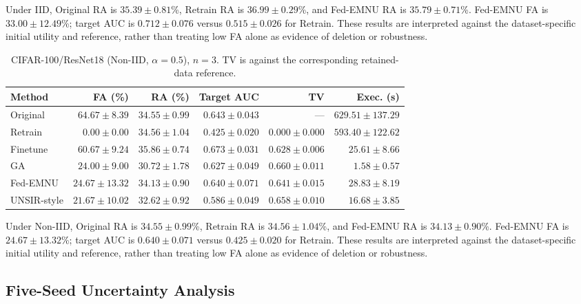 \documentclass[software,article,submit,moreauthors]{Definitions/mdpi}
\begin{document}
Under IID, Original RA is $35.39 \pm 0.81$\%, Retrain RA is $36.99 \pm 0.29$\%, and Fed-EMNU RA is $35.79 \pm 0.71$\%. Fed-EMNU FA is $33.00 \pm 12.49$\%; target AUC is $0.712 \pm 0.076$ versus $0.515 \pm 0.026$ for Retrain. These results are interpreted against the dataset-specific initial utility and reference, rather than treating low FA alone as evidence of deletion or robustness.

\begin{table}[H]
\caption{CIFAR-100/ResNet18 (Non-IID, $\alpha=0.5$), $n=3$. TV is against the corresponding retained-data reference.}
\label{tab:c100-noniid}
\centering\footnotesize\setlength{\tabcolsep}{3.5pt}
\begin{tabular}{lrrrrr}
\toprule
Method & FA (\%) & RA (\%) & Target AUC & TV & Exec. (s)\\
\midrule
Original & $64.67 \pm 8.39$ & $34.55 \pm 0.99$ & $0.643 \pm 0.043$ & --- & $629.51 \pm 137.29$\\
Retrain & $0.00 \pm 0.00$ & $34.56 \pm 1.04$ & $0.425 \pm 0.020$ & $0.000 \pm 0.000$ & $593.40 \pm 122.62$\\
Finetune & $60.67 \pm 9.24$ & $35.86 \pm 0.74$ & $0.673 \pm 0.031$ & $0.628 \pm 0.006$ & $25.61 \pm 8.66$\\
GA & $24.00 \pm 9.00$ & $30.72 \pm 1.78$ & $0.627 \pm 0.049$ & $0.660 \pm 0.011$ & $1.58 \pm 0.57$\\
Fed-EMNU & $24.67 \pm 13.32$ & $34.13 \pm 0.90$ & $0.640 \pm 0.071$ & $0.641 \pm 0.015$ & $28.83 \pm 8.19$\\
UNSIR-style & $21.67 \pm 10.02$ & $32.62 \pm 0.92$ & $0.586 \pm 0.049$ & $0.658 \pm 0.010$ & $16.68 \pm 3.85$\\
\bottomrule
\end{tabular}
\end{table}

Under Non-IID, Original RA is $34.55 \pm 0.99$\%, Retrain RA is $34.56 \pm 1.04$\%, and Fed-EMNU RA is $34.13 \pm 0.90$\%. Fed-EMNU FA is $24.67 \pm 13.32$\%; target AUC is $0.640 \pm 0.071$ versus $0.425 \pm 0.020$ for Retrain. These results are interpreted against the dataset-specific initial utility and reference, rather than treating low FA alone as evidence of deletion or robustness.

\subsection{Five-Seed Uncertainty Analysis}

\label{sec:uncertainty}
\end{document}
